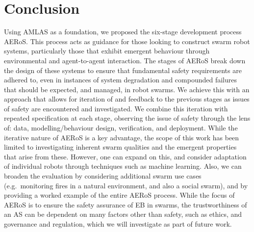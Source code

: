 \documentclass[runningheads]{llncs}
\begin{document}
\section{Conclusion} \label{discussion-conclusions}
Using AMLAS \cite{Hawkins2021} as a foundation, we proposed the six-stage development process AERoS. This process acts as guidance for those looking to construct swarm robot systems, particularly those that exhibit emergent behaviour through environmental and agent-to-agent interaction. The stages of AERoS break down the design of these systems to ensure that fundamental safety requirements are adhered to, even in instances of system degradation and compounded failures that should be expected, and managed, in robot swarms. We achieve this with an approach that allows for iteration of and feedback to the previous stages as issues of safety are encountered and investigated. We combine this iteration with repeated specification at each stage, observing the issue of safety through the lens of: data, modelling/behaviour design, verification, and deployment. 
While the iterative nature of AERoS is a key advantage, the scope of this work has been limited to investigating inherent swarm qualities and the emergent properties that arise from these. 
However, one can expand on this, and consider adaptation of individual robots through techniques such as machine learning. %
Also, we can broaden the evaluation by considering additional swarm use cases (e.g.\ monitoring fires in a natural environment, and also a social swarm), and by providing a worked example of the entire AERoS process. 
While the focus of AERoS is to ensure the safety assurance of EB in swarms, the trustworthiness of an AS can be dependent on many factors other than safety, such as ethics, and governance and regulation, which we will investigate as part of future work.%
\end{document}
